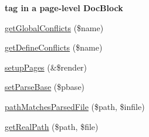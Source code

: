 \begin{Indent}{\bf tag in a page-\/level \-Doc\-Block}
\begin{DoxyCompactItemize}
\item 
\hyperlink{class_procedural_pages_a5232aeda24f61b89a582b497f40d5c05}{get\-Global\-Conflicts} (\$name)
\item 
\hyperlink{class_procedural_pages_abe22b8eb96e79d7d5c6656f6e3d80cf7}{get\-Define\-Conflicts} (\$name)
\item 
\hyperlink{class_procedural_pages_a6d4b1eff46ff8bd07e362a7c88c43da7}{setup\-Pages} (\&\$render)
\item 
\hyperlink{class_procedural_pages_a4fc81946cea0c597f985547b93409129}{set\-Parse\-Base} (\$pbase)
\item 
\hyperlink{class_procedural_pages_aab2484c31423437433dc924372a04b55}{path\-Matches\-Parsed\-File} (\$path, \$infile)
\item 
\hyperlink{class_procedural_pages_ac8622bb724ac13d619e4f9aa421f0ade}{get\-Real\-Path} (\$path, \$file)
\end{DoxyCompactItemize}
\end{Indent}
